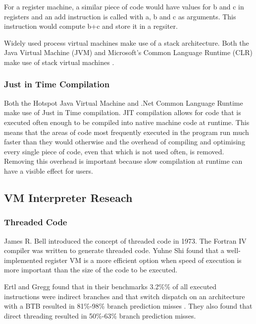 \documentclass[english,a4paper]{article}
\begin{document}
For a register machine, a similar piece of code would have values for
b and c in registers and an add instruction is called with a, b and c
as arguments. This instruction would compute b+c and store it in a
regsiter.

Widely used process virtual machines make use of a stack
architecture. Both the Java Virtual Machine (JVM) and Microsoft's
Common Language Runtime (CLR) make use of stack virtual machines
\cite{CLI}\cite{JVM}.

\subsubsection{Just in Time Compilation}

Both the Hotspot Java Virtual Machine and .Net Common Language 
Runtime make use of Just in Time compilation\cite{JJIT}. JIT 
compilation allows for code that is executed often enough to be
compiled into native machine code at runtime. This means that the 
areas of code most frequently executed in the program run much faster 
than they would otherwise and the overhead of compiling and 
optimising every single piece of code, even that which is not used 
often, is removed. Removing this overhead is important because slow 
compilation at runtime can have a visible effect for users.

\subsection{VM Interpreter Reseach}



\subsubsection{Threaded Code}

James R. Bell introduced the concept of threaded code in 1973. The
Fortran IV compiler was written to generate threaded code.\cite{Bell}
Yuhne Shi\cite{Shi2007} found that a well-implemented register VM is a
more efficient option when speed of execution is more important than
the size of the code to be executed.

Ertl and Gregg found that in their benchmarks 3.2\%\% of
all executed instructions were indirect branches and that switch
dispatch on an architecture with a BTB resulted in 81\%-98\% branch
prediction misses \cite{EfficientInterpreters}. They also found that
direct threading resulted in 50\%-63\% branch prediction misses.
\end{document}
